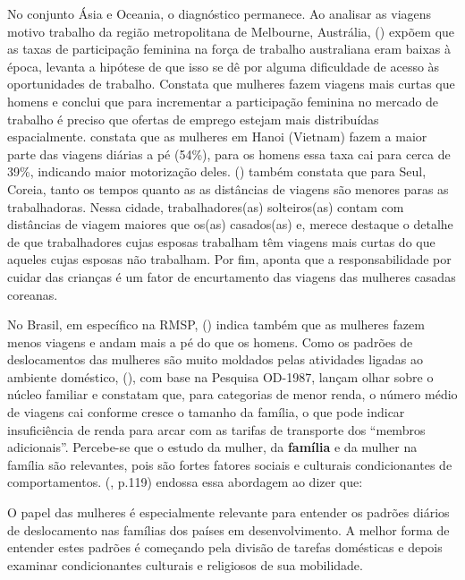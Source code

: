 No conjunto Ásia e Oceania, o diagnóstico permanece.
Ao analisar as viagens motivo trabalho da região metropolitana de Melbourne, Austrália,  (\citeyear{HOWE1982}) expõem que as taxas de participação feminina na força de trabalho australiana eram baixas à época, levanta a hipótese de que isso se dê por alguma dificuldade de acesso às oportunidades de trabalho. Constata que mulheres fazem viagens mais curtas que homens e conclui que para incrementar a participação feminina no mercado de trabalho é preciso que ofertas de emprego estejam mais distribuídas espacialmente. 
 constata que as mulheres em Hanoi (Vietnam) fazem a maior parte das viagens diárias a pé (54\%), para os homens essa taxa cai para cerca de 39\%, indicando maior motorização deles.
 (\citeyear{SONG2003}) também constata que para Seul, Coreia, tanto os tempos quanto as as distâncias de viagens são menores paras as trabalhadoras. Nessa cidade, trabalhadores(as) solteiros(as) contam com distâncias de viagem maiores que os(as) casados(as) e, merece destaque o detalhe de que trabalhadores cujas esposas trabalham têm viagens mais curtas do que aqueles cujas esposas não trabalham. Por fim,  aponta que a responsabilidade por cuidar das crianças é um fator de encurtamento das viagens das mulheres casadas coreanas.


No Brasil, em específico na RMSP,  (\citeyear{VASCONCELLOS2001}) indica também que as mulheres fazem menos viagens e andam mais a pé do que os homens. Como os padrões de deslocamentos das mulheres são muito moldados pelas atividades ligadas ao ambiente doméstico,  (\citeyear{STRAMBI1998}), com base na Pesquisa OD-1987, lançam olhar sobre o núcleo familiar e constatam que, 
para categorias de menor renda, o número médio de viagens cai conforme cresce o tamanho da família, o que pode indicar insuficiência de renda para arcar com as tarifas de transporte dos ``membros adicionais''. Percebe-se que o estudo da mulher, da \textbf{família} e da mulher na família são relevantes, pois são fortes fatores sociais e culturais condicionantes de comportamentos.  (\citeyear{VASCONCELLOS2001}, p.119) endossa essa abordagem ao dizer que:

\clearpage
\begin{citacao}
O papel das mulheres é especialmente relevante para entender os padrões diários de deslocamento nas famílias dos países em desenvolvimento. A melhor forma de entender estes padrões é começando pela divisão de tarefas domésticas e depois examinar condicionantes culturais e religiosos de sua mobilidade.
\end{citacao}



